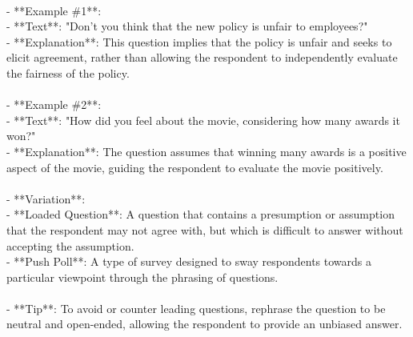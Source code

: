 \documentclass[a4paper,12pt,single,pdftex]{scrbook}
\begin{document}
    
      
    \\

    
      - **Example \#1**:
    \\

    
        - **Text**: "Don’t you think that the new policy is unfair to employees?"
    \\

    
        - **Explanation**: This question implies that the policy is unfair and seeks to elicit agreement, rather than allowing the respondent to independently evaluate the fairness of the policy.
    \\

    
      
    \\

    
      - **Example \#2**:
    \\

    
        - **Text**: "How did you feel about the movie, considering how many awards it won?"
    \\

    
        - **Explanation**: The question assumes that winning many awards is a positive aspect of the movie, guiding the respondent to evaluate the movie positively.
    \\

    
      
    \\

    
      - **Variation**:
    \\

    
        - **Loaded Question**: A question that contains a presumption or assumption that the respondent may not agree with, but which is difficult to answer without accepting the assumption.
    \\

    
        - **Push Poll**: A type of survey designed to sway respondents towards a particular viewpoint through the phrasing of questions.
    \\

    
      
    \\

    
      - **Tip**: To avoid or counter leading questions, rephrase the question to be neutral and open-ended, allowing the respondent to provide an unbiased answer.
    \\

    
      
\end{document}
